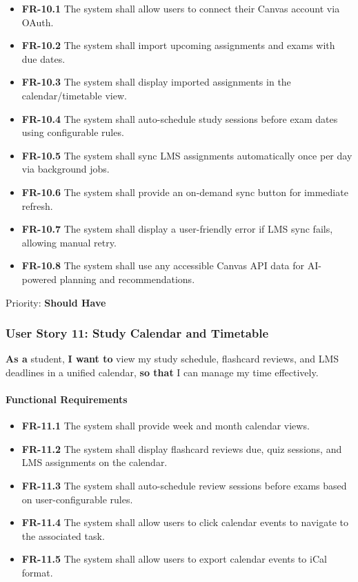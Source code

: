 \documentclass[12pt,a4paper]{article}
\begin{document}
\begin{itemize}
    \item \textbf{FR-10.1} The system shall allow users to connect their Canvas account via OAuth.
    \item \textbf{FR-10.2} The system shall import upcoming assignments and exams with due dates.
    \item \textbf{FR-10.3} The system shall display imported assignments in the calendar/timetable view.
    \item \textbf{FR-10.4} The system shall auto-schedule study sessions before exam dates using configurable rules.
    \item \textbf{FR-10.5} The system shall sync LMS assignments automatically once per day via background jobs.
    \item \textbf{FR-10.6} The system shall provide an on-demand sync button for immediate refresh.
    \item \textbf{FR-10.7} The system shall display a user-friendly error if LMS sync fails, allowing manual retry.
    \item \textbf{FR-10.8} The system shall use any accessible Canvas API data for AI-powered planning and recommendations.
\end{itemize}

Priority: \textbf{Should Have}

\subsubsection{User Story 11: Study Calendar and Timetable}

\textbf{As a} student, \textbf{I want to} view my study schedule, flashcard reviews, and LMS deadlines in a unified calendar, \textbf{so that} I can manage my time effectively.

\paragraph{Functional Requirements}

\begin{itemize}
    \item \textbf{FR-11.1} The system shall provide week and month calendar views.
    \item \textbf{FR-11.2} The system shall display flashcard reviews due, quiz sessions, and LMS assignments on the calendar.
    \item \textbf{FR-11.3} The system shall auto-schedule review sessions before exams based on user-configurable rules.
    \item \textbf{FR-11.4} The system shall allow users to click calendar events to navigate to the associated task.
    \item \textbf{FR-11.5} The system shall allow users to export calendar events to iCal format.
\end{itemize}
\end{document}
